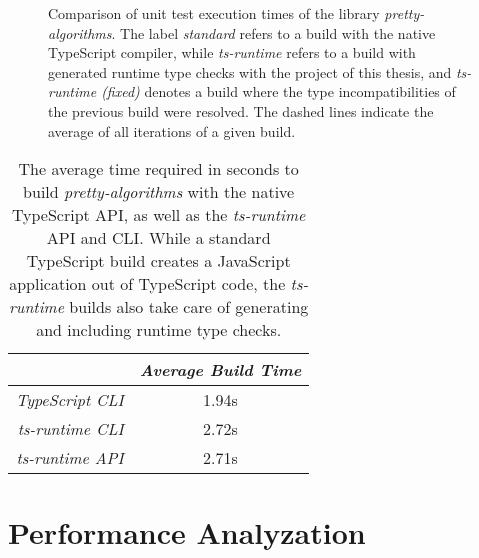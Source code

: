 \begin{figure}
\centering

\caption{Comparison of unit test execution times of the library \emph{pretty-algorithms}. The label \emph{standard} refers to a build with the native TypeScript compiler, while \emph{ts-runtime} refers to a build with generated runtime type checks with the project of this thesis, and \emph{ts-runtime (fixed)} denotes a build where the type incompatibilities of the previous build were resolved. The dashed lines indicate the average of all iterations of a given build.}
\label{fig:operational-test}
\end{figure}

\begin{table}
\caption{The average time required in seconds to build \emph{pretty-algorithms} with the native TypeScript API, as well as the \emph{ts-runtime} API and CLI. While a standard TypeScript build creates a JavaScript application out of TypeScript code, the \emph{ts-runtime} builds also take care of generating and including runtime type checks.}
\label{tab:build-time}
\centering
\setlength{\tabcolsep}{5mm}
\def\arraystretch{1.25}
\small
\begin{tabular}{|r||c|}
    \hline
    & \emph{Average Build Time} \\
    \hline
    \hline
    \emph{TypeScript CLI} & 1.94s \\
    \hline
    \emph{ts-runtime CLI} & 2.72s \\
    \hline
    \emph{ts-runtime API} & 2.71s \\
    \hline
  \end{tabular}
\end{table}

\section{Performance Analyzation}
\label{sec:performance-analyzation}


